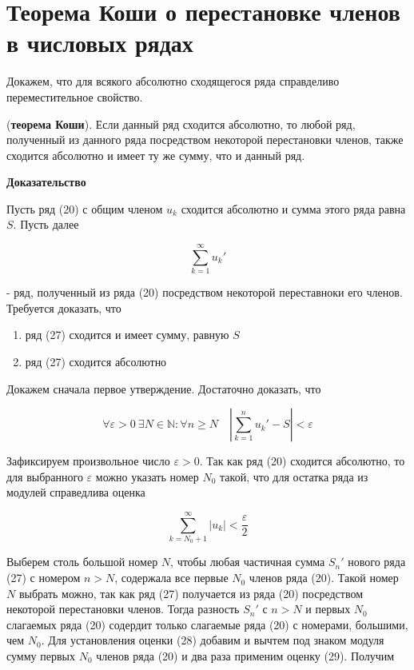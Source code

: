 \section{Теорема Коши о перестановке членов в числовых рядах}

Докажем, что для всякого абсолютно  сходящегося ряда справделиво переместительное свойство.

\begin{theorem}
	(\textbf{теорема Коши}). Если данный ряд сходится абсолютно, то любой ряд, полученный из данного ряда посредством некоторой перестановки членов, также сходится  абсолютно и имеет ту же сумму, что и данный ряд.
\end{theorem}
\textbf{Доказательство}

Пусть ряд (20) с общим членом $u_k$ сходится абсолютно и сумма этого ряда равна $S$.  Пусть далее

\begin{equation}
	\displaystyle\sum_{k = 1}^\infty u_k'
\end{equation}

- ряд, полученный из ряда (20) посредством некоторой переставноки его членов. Требуется доказать, что

\begin{enumerate}
	\item ряд (27) сходится и имеет сумму, равную $S$
	\item ряд (27) сходится абсолютно
\end{enumerate}

Докажем сначала первое утверждение. Достаточно доказать, что

\begin{equation}
	\forall\varepsilon > 0\ \exists N\in\mathbb{N}: \forall n \geqslant N \quad \left| \displaystyle\sum_{k = 1}^n u_k' - S \right| < \varepsilon
\end{equation}

Зафиксируем произвольное число $\varepsilon > 0$. Так как ряд (20) сходится абсолютно, то для выбранного $\varepsilon$ можно указать номер $N_0$ такой, что для остатка ряда из модулей справедлива оценка

\begin{equation}
	\displaystyle\sum_{k = N_0 + 1}^\infty |u_k| < \frac{\varepsilon}{2}
\end{equation}

Выберем столь большой номер $N$, чтобы любая частичная сумма $S_n'$ нового ряда (27) с номером $n > N$, содержала все первые $N_0$ членов ряда (20). Такой номер $N$ выбрать можно, так как ряд (27) получается из ряда (20) посредством некоторой перестановки членов. Тогда разность $S_n'$ с $n > N$ и первых $N_0$ слагаемых ряда (20) содердит только слагаемые ряда (20) с номерами, большими, чем $N_0$. Для установления оценки (28) добавим и вычтем под знаком модуля сумму первых $N_0$ членов ряда (20) и два раза применим оценку (29). Получим

